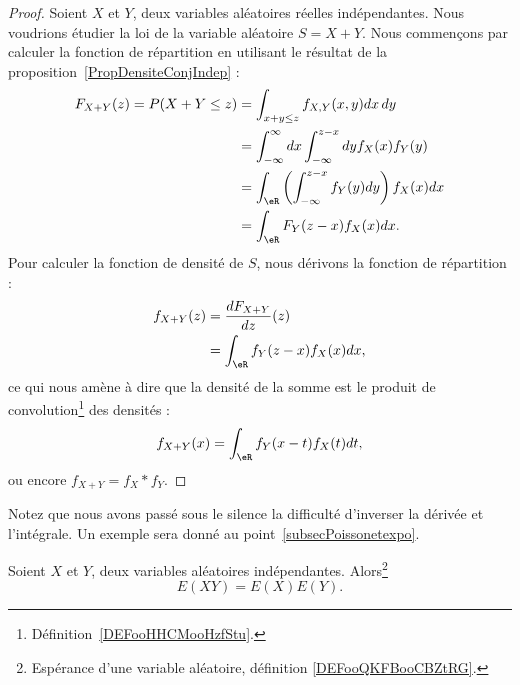 \begin{proof}
	Soient \( X\) et \( Y\), deux variables aléatoires réelles indépendantes. Nous voudrions étudier la loi de la variable aléatoire \( S=X+Y\). Nous commençons par calculer la fonction de répartition en utilisant le résultat de la proposition~\ref{PropDensiteConjIndep} :
	\begin{subequations}
		\begin{align}
			F_{X+Y}(z)=P(X+Y\leq z) & =\int_{x+y\leq z}f_{X,Y}(x,y)dx\,dy                            \\
			                        & =\int_{-\infty}^{\infty}dx\int_{-\infty}^{z-x}dyf_X(x)f_Y(y)   \\
			                        & =\int_{\eR}\left( \int_{-\infty}^{z-x}f_Y(y)dy \right)f_X(x)dx \\
			                        & =\int_{\eR}F_Y(z-x)f_X(x)dx.
		\end{align}
	\end{subequations}
	Pour calculer la fonction de densité de \( S\), nous dérivons la fonction de répartition :
	\begin{subequations}
		\begin{align}
			f_{X+Y}(z) & =\frac{ d F_{X+Y} }{ d z }(z) \\
			           & =\int_{\eR}f_Y(z-x)f_X(x)dx,
		\end{align}
	\end{subequations}
	ce qui nous amène à dire que la densité de la somme est le produit de convolution\footnote{Définition~\ref{DEFooHHCMooHzfStu}.} des densités :
	\begin{equation}        \label{EQooFKHHooWvUBMV}
		f_{X+Y}(x)=\int_{\eR}f_Y(x-t)f_X(t)dt,
	\end{equation}
	ou encore \( f_{X+Y}=f_X* f_Y\).
\end{proof}

Notez que nous avons passé sous le silence la difficulté d'inverser la dérivée et l'intégrale. Un exemple sera donné au point~\ref{subsecPoissonetexpo}.

\begin{lemma}       \label{LemEXYEXEYprodindep}
	Soient \( X\) et \( Y\), deux variables aléatoires indépendantes. Alors\footnote{Espérance d'une variable aléatoire, définition \ref{DEFooQKFBooCBZtRG}.}
	\begin{equation}
		E(XY)=E(X)E(Y).
	\end{equation}
\end{lemma}

